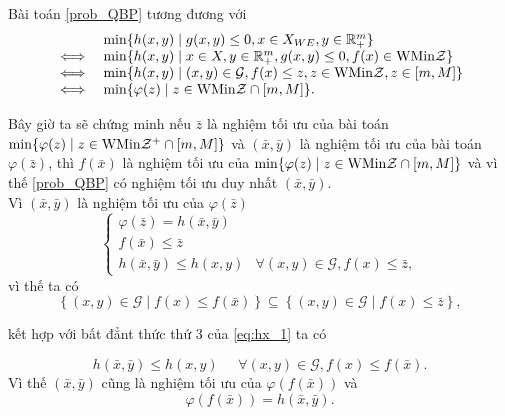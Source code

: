 \begin{cm}
    Bài toán \ref{prob_QBP} tương đương với
    \[
    \begin{array}{cl}
     & \min\{h(x,y)\mid g(x,y)\le0,x\in X_{WE},y\in\mathbb{R}_{+}^{m}\}\\
    \iff & \min\{h(x,y)\mid x\in X,y\in\mathbb{R}_{+}^{m},g(x,y)\le0,f(x)\in{\rm WMin}\mathcal{Z}\}\\
    \iff & \min\{h(x,y)\mid (x,y)\in\mathcal{G},f(x)\le z,z\in{\rm WMin}\mathcal{Z},z\in[m,M]\}\\
    \iff & \min\{\varphi(z)\mid z\in{\rm WMin}\mathcal{Z}\cap[m,M]\}.
    \end{array}
    \]
    
    Bây giờ ta sẽ chứng minh nếu $\bar{z}$ là nghiệm tối ưu của bài toán $\min\{\varphi(z)\mid z\in{\rm WMin}\mathcal{Z}^{+}\cap[m,M]\}$
    và $(\bar{x},\bar{y})$ là nghiệm tối ưu của bài toán $\varphi(\bar{z})$, thì $f(\bar{x})$ là nghiệm tối ưu của $\min\{\varphi(z)\mid z\in{\rm WMin}\mathcal{Z}\cap[m,M]\}$ và vì thế \ref{prob_QBP} có nghiệm tối ưu duy nhất $(\bar{x},\bar{y})$.\\
    \indent Vì $(\bar{x},\bar{y})$ là nghiệm tối ưu của $\varphi(\bar{z})$
    \begin{equation}
    \begin{cases}
    \varphi(\bar{z})=h(\bar{x},\bar{y})\\
    f(\bar{x})\le\bar{z}\\
    h(\bar{x},\bar{y})\le h(x,y) & \forall (x,y)\in\mathcal{G},f(x)\le\bar{z},
    \end{cases}\label{eq:hx_1}
    \end{equation}
    vì thế ta có
    \[
    \left\{(x,y)\in\mathcal{G}\mid f(x)\le f(\bar{x})\right\} \subseteq\left\{(x,y)\in\mathcal{G} \mid f(x)\le \bar{z}\right\},
    \]
    
    kết hợp với bất đẳnt thức thứ 3 của \eqref{eq:hx_1} ta có
    
    \[
    h(\bar{x},\bar{y})\le h(x,y)\;\;\;\;\;\forall (x,y)\in\mathcal{G},f(x)\le f(\bar{x}).
    \] 
    Vì thế $(\bar{x},\bar{y})$ cũng là nghiệm tối ưu của $\varphi(f(\bar{x}))$ và
    \begin{equation}
    \varphi(f(\bar{x}))=h(\bar{x},\bar{y}).\label{eq:hx_2}
    \end{equation}
    

\end{cm}
